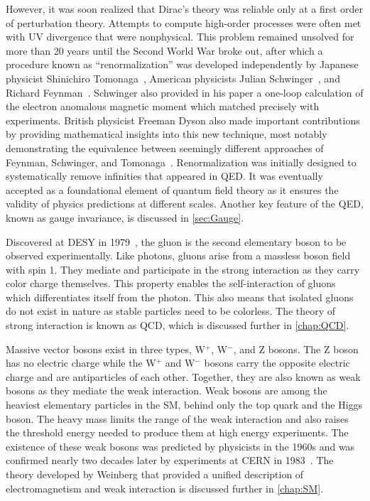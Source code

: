 However, it was soon realized that Dirac's theory was reliable only at a first order of perturbation theory. Attempts to compute high-order processes were often met with \ac{UV} divergence that were nonphysical. This problem remained unsolved for more than 20 years until the Second World War broke out, after which a procedure known as ``renormalization'' was developed independently by Japanese physicist Shinichiro Tomonaga~\cite{Tomonaga:1946zz}, American physicists Julian Schwinger~\cite{Schwinger:1948iu}, and Richard Feynman~\cite{Feynman:1950ir}. Schwinger also provided in his paper a one-loop calculation of the electron anomalous magnetic moment which matched precisely with experiments. British physicist Freeman Dyson also made important contributions by providing mathematical insights into this new technique, most notably demonstrating the equivalence between seemingly different approaches of Feynman, Schwinger, and Tomonaga~\cite{Dyson:1949bp}. Renormalization was initially designed to systematically remove infinities that appeared in \ac{QED}. It was eventually accepted as a foundational element of quantum field theory as it ensures the validity of physics predictions at different scales. Another key feature of the \ac{QED}, known as gauge invariance, is discussed in \autoref{sec:Gauge}.

Discovered at DESY in 1979~\cite{TASSO:1979zyf}, the gluon is the second elementary boson to be observed experimentally. Like photons, gluons arise from a massless boson field with spin 1. They mediate and participate in the strong interaction as they carry color charge themselves. This property enables the self-interaction of gluons which differentiates itself from the photon. This also means that isolated gluons do not exist in nature as stable particles need to be colorless. The theory of strong interaction is known as \ac{QCD}, which is discussed further in \autoref{chap:QCD}.

Massive vector bosons exist in three types, W$^{+}$, W$^{-}$, and Z bosons. The Z boson has no electric charge while the W$^{+}$ and W$^{-}$ bosons carry the opposite electric charge and are antiparticles of each other. Together, they are also known as weak bosons as they mediate the weak interaction. Weak bosons are among the heaviest elementary particles in the \ac{SM}, behind only the top quark and the Higgs boson. The heavy mass limits the range of the weak interaction and also raises the threshold energy needed to produce them at high energy experiments. The existence of these weak bosons was predicted by physicists in the 1960s and was confirmed nearly two decades later by experiments at \ac{CERN} in 1983~\cite{UA1:1983crd,UA2:1983tsx,UA1:1983mne,UA2:1983mlz}. The theory developed by Weinberg that provided a unified description of electromagnetism and weak interaction is discussed further in \autoref{chap:SM}.

